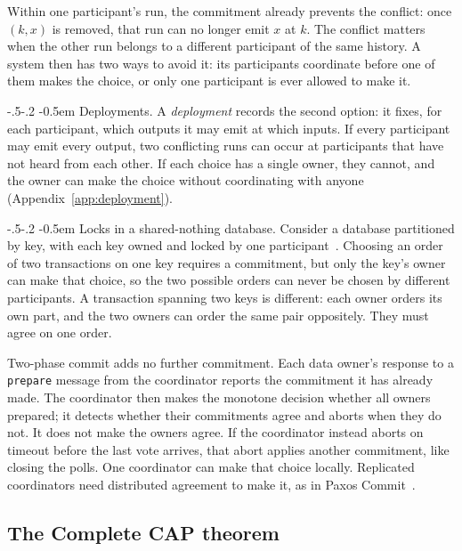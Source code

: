 \documentclass[sigconf]{cidr-2027}
\makeatletter
\theoremstyle{remark}
\renewcommand\paragraph{\@startsection{paragraph}{4}{\z@}%
  {-.5\baselineskip \@plus -2\p@ \@minus -.2\p@}%
  {-0.5em}%
  {\normalfont\bfseries}}
\newcommand{\commitment}{commitment\xspace}
\newcommand{\commitments}{commitments\xspace}
\makeatother
\begin{document}
Within one participant's run, the \commitment already prevents the conflict:
once $(k,x)$ is removed, that run can no longer emit $x$ at $k$. The conflict
matters when the other run belongs to a different participant of the same
history. A system then has two ways to avoid it: its participants coordinate
before one of them makes the choice, or only one participant is ever allowed to
make it.

\paragraph{Deployments.}
A \emph{deployment} records the second option: it fixes, for each participant,
which outputs it may emit at which inputs. If every participant may emit every
output, two conflicting runs can occur at participants that have not heard
from each other. If each choice has a single owner, they cannot, and the owner
can make the choice without coordinating with anyone
(Appendix~\ref{app:deployment}).

\paragraph{Locks in a shared-nothing database.}
Consider a database partitioned by key, with each key owned and locked by one
participant~\cite{stonebraker1986sharednothing}. Choosing an order of two
transactions on one key requires a \commitment, but only the key's owner can
make that choice, so the two possible orders can never be chosen by different
participants. A transaction spanning two keys is different: each owner orders
its own part, and the two owners can order the same pair oppositely. They must
agree on one order.

Two-phase commit adds no further \commitment. Each data owner's response to a \texttt{prepare} message
from the coordinator reports the
\commitment it has already made. The coordinator then makes the monotone
decision whether all owners prepared; it detects whether their \commitments
agree and aborts when they do not. It does not make the owners agree. If the
coordinator instead aborts on timeout before the last vote arrives, that abort
applies another \commitment, like closing the polls. One coordinator can make
that choice locally. Replicated coordinators need distributed agreement to
make it, as in Paxos Commit~\cite{gray2006consensus}.

\subsection{The Complete CAP theorem}
\label{sec:complete-cap}
\end{document}
